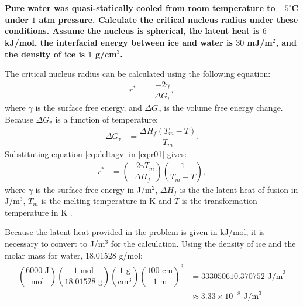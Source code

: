 \newpage
\section{}

\subsection{}
\textbf{Pure water was quasi-statically cooled from room temperature to $-5^{\circ}$C under $1$ atm pressure. Calculate the critical nucleus radius under these conditions. Assume the nucleus is spherical, the latent heat is $6$ kJ/mol, the interfacial energy between ice and water is $30$ mJ/m$^2$, and the density of ice is $1$ g/cm$^3$.}

The critical nucleus radius can be calculated using the following equation: 
\begin{align}
  \label{eq:r01}
  r^*&=\dfrac{-2\gamma}{\Delta G_v},
\end{align}
where $\gamma$ is the surface free energy, and $\Delta G_v$ is the volume free energy change. Because $\Delta G_v$ is a function of temperature:
\begin{align}
  \label{eq:deltagv}
  \Delta G_v&= \dfrac{\Delta H_f\left(T_m-T\right)}{T_m}.
\end{align}
Substituting equation \ref{eq:deltagv} in \ref{eq:r01} gives: 
\begin{align}
  \label{eq:nucleus_radius}
  r^*&=\left(\dfrac{-2\gamma T_m}{\Delta H_f}\right)\left(\dfrac{1}{T_m - T}\right),
\end{align}
where $\gamma$ is the surface free energy in J/m$^2$, $\Delta H_f$ is the the latent heat of fusion in J/m$^3$, $T_m$ is the melting temperature in K and $T$ is the transformation temperature in K \citep[p.~346-347]{callister2010materials}.

Because the latent heat provided in the problem is given in kJ/mol, it is necessary to convert to J/m$^3$ for the calculation. Using the density of ice and the molar mass for water, 18.01528 g/mol:
\begin{align}
  \begin{split}
    \left(\dfrac{6000\text{ J}}{\text{mol}}\right)\left(\dfrac{1\text{ mol}}{18.01528\text{ g}}\right)\left(\dfrac{1\text{ g}}{\text{cm}^3}\right)\left(\dfrac{100\text{ cm}}{1\text{ m}}\right)^3&=333050610.370752 \text{ J/m}^3 \\
  &\approx 3.33\times10^{-8} \text{ J/m}^3
  \end{split}
  \label{eq:deltaH_calculation}
\end{align}

